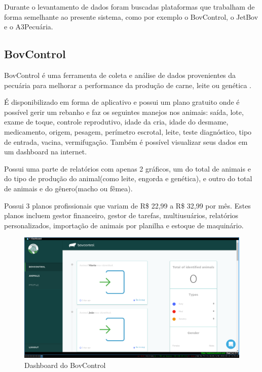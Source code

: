\documentclass[12pt]{article}
\begin{document}
\begin{titlepage}

Durante o levantamento de dados foram buscadas plataformas que trabalham de forma semelhante ao presente sistema, como por exemplo o BovControl, o JetBov e o A3Pecuária.

\subsection{BovControl}

BovControl é uma ferramenta de coleta e análise de dados provenientes da pecuária para melhorar a performance da produção de carne, leite ou genética \cite{bovcontrol10}. 

É disponibilizado em forma de aplicativo e possui um plano gratuito onde é possível gerir um rebanho e faz os seguintes manejos nos animais: saída, lote, exame de toque, controle reprodutivo, idade da cria, idade do desmame, medicamento, origem, pesagem, perímetro escrotal, leite, teste diagnóstico, tipo de entrada, vacina, vermifugação. Também é possível visualizar seus dados em um dashboard na internet.

Possui uma parte de relatórios com apenas 2 gráficos, um do total de animais e do tipo de produção do animal(como leite, engorda e genética), e outro do total de animais e do gênero(macho ou fêmea). 

Possui 3 planos profissionais que variam de R\$ 22,99 a R\$ 32,99 por mês. Estes planos incluem gestor financeiro, gestor de tarefas, multiusuários, relatórios personalizados, importação de animais por planilha e estoque de maquinário.  

\begin{figure}[!h]
\begin{center}
\caption{Dashboard do BovControl}
\includegraphics[width=6in]{img/bovcontrol.png}


\end{center}
\end{figure}
\end{titlepage}
\end{document}
